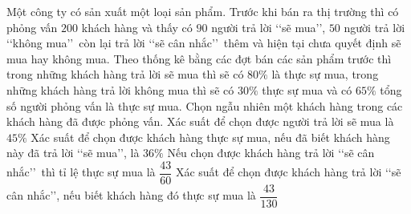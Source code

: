 \begin{ex}%
	Một công ty có sản xuất một loại sản phẩm. Trước khi bán ra thị trường thì có phỏng vấn $200$ khách hàng và thấy có $90$ người trả lời \lq\lq sẽ mua\rq\rq, $50$ người trả lời \lq\lq không mua\rq\rq~còn lại trả lời \lq\lq sẽ cân nhắc\rq\rq~thêm và hiện tại chưa quyết định sẽ mua hay không mua. Theo thống kê bằng các đợt bán các sản phẩm trước thì trong những khách hàng trả lời sẽ mua thì sẽ có $80\%$ là thực sự mua, trong những khách hàng trả lời không mua thì sẽ có $30\%$ thực sự mua và có $65\%$ tổng số người phỏng vấn là thực sự mua. Chọn ngẫu nhiên một khách hàng trong các khách hàng đã được phỏng vấn.
	\choiceTF
	{\True Xác suất để chọn được người trả lời sẽ mua là $45\%$}
	{Xác suất để chọn được khách hàng thực sự mua, nếu đã biết khách hàng này đã trả lời \lq\lq sẽ mua\rq\rq, là $36\%$}
	{\True Nếu chọn được khách hàng trả lời \lq\lq sẽ cân nhắc\rq\rq~thì tỉ lệ thực sự mua là $\dfrac{43}{60}$}
	{\True Xác suất để chọn được khách hàng trả lời \lq\lq sẽ cân nhắc\rq\rq, nếu biết khách hàng đó thực sự mua là $\dfrac{43}{130}$}
\end{ex}

